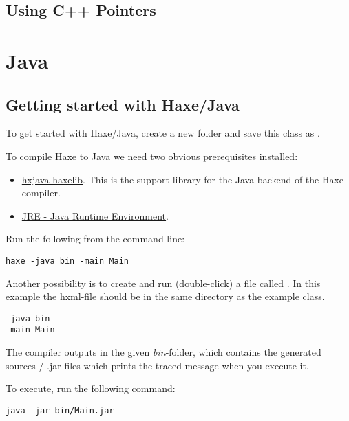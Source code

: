 \subsection{Using C++ Pointers}
\label{target-cpp-pointers}



\section{Java}
\label{target-java}


\subsection{Getting started with Haxe/Java}
\label{target-java-getting-started}

To get started with Haxe/Java, create a new folder and save this class as .


To compile Haxe to Java we need two obvious prerequisites installed:

\begin{itemize}
	\item \href{http://lib.haxe.org/p/hxjava}{hxjava haxelib}. This is the support library for the Java backend of the Haxe compiler.
	\item \href{https://java.com/download/}{JRE - Java Runtime Environment}.
\end{itemize}

Run the following from the command line:

\begin{lstlisting}
haxe -java bin -main Main
\end{lstlisting}

Another possibility is to create and run (double-click) a file called . In this example the hxml-file should be in the same directory as the example class.

\begin{lstlisting}
-java bin
-main Main
\end{lstlisting}

The compiler outputs in the given \emph{bin}-folder, which contains the generated sources / .jar files which prints the traced message when you execute it. 

To execute, run the following command:

\begin{lstlisting}
java -jar bin/Main.jar
\end{lstlisting}

